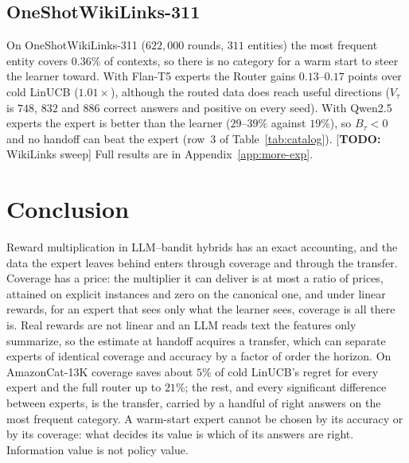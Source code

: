 \documentclass{article}
\theoremstyle{definition}
\theoremstyle{remark}
\theoremstyle{remark}
\newcommand{\todo}[1]{\textcolor{red!70!black}{[\textbf{TODO:} #1]}}
\begin{document}
\subsection{OneShotWikiLinks-311}
\label{sec:wiki}

On OneShotWikiLinks-311 ($622{,}000$ rounds, $311$ entities) the most
frequent entity covers $0.36\%$ of contexts, so there is no category for a
warm start to steer the learner toward. With Flan-T5 experts the Router
gains $0.13$--$0.17$ points over cold LinUCB ($1.01\times$), although the
routed data does reach useful directions ($V_\tau$ is $748$, $832$ and $886$
correct answers and positive on every seed). With Qwen2.5 experts the expert
is better than the learner ($29$--$39\%$ against $19\%$), so $B_\tau<0$ and no
handoff can beat the expert (row~3 of Table~\ref{tab:catalog}).
\todo{WikiLinks sweep} Full results are in Appendix~\ref{app:more-exp}.

\section{Conclusion}
\label{sec:conclusion}

Reward multiplication in LLM--bandit hybrids has an exact accounting, and the
data the expert leaves behind enters through coverage and through the
transfer. Coverage has a price: the multiplier it can deliver is at most a
ratio of prices, attained on explicit instances and zero on the canonical
one, and under linear rewards, for an expert that sees only what the learner
sees, coverage is all there is. Real rewards are not linear and an LLM reads
text the features only summarize, so the estimate at handoff acquires a
transfer, which can separate experts of identical coverage and accuracy by a
factor of order the horizon. On AmazonCat-13K coverage saves about $5\%$ of
cold LinUCB's regret for every expert and the full router up to $21\%$; the
rest, and every significant difference between experts, is the transfer,
carried by a handful of right answers on the most frequent category. A
warm-start expert cannot be chosen by its accuracy or by its coverage: what
decides its value is which of its answers are right. Information value is
not policy value.
\end{document}
